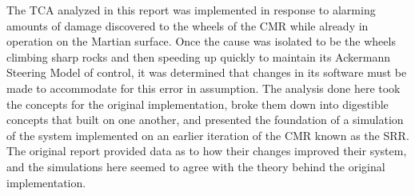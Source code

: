 The \ac{TCA} analyzed in this report was implemented in response to alarming amounts of damage discovered to the wheels of the \ac{CMR} while already in operation on the Martian surface. Once the cause was isolated to be the wheels climbing sharp rocks and then speeding up quickly to maintain its Ackermann Steering Model of control, it was determined that changes in its software must be made to accommodate for this error in assumption. The analysis done here took the concepts for the original implementation, broke them down into digestible concepts that built on one another, and presented the foundation of a simulation of the system implemented on an earlier iteration of the \ac{CMR} known as the \ac{SRR}. The original report provided data as to how their changes improved their system, and the simulations here seemed to agree with the theory behind the original implementation.
